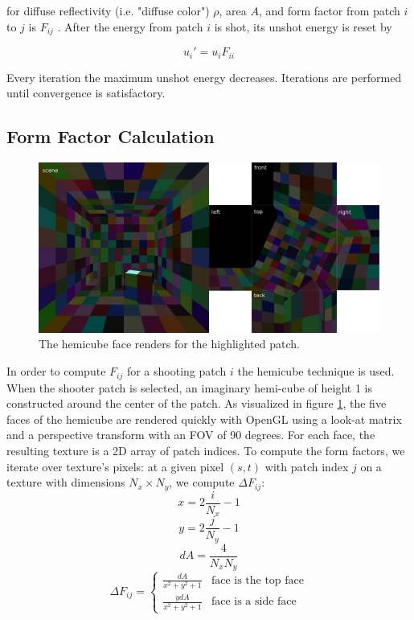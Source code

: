 \documentclass[sigconf]{acmart}
\begin{document}
for diffuse reflectivity (i.e. "diffuse color") ${\rho}$, area $A$, and form factor from patch $i$ to $j$ is $F_{ij}$ \cite{progref}. After the energy from patch $i$ is shot, its unshot energy is reset by

\[u_i' = u_i F_{ii}\]

Every iteration the maximum unshot energy decreases. Iterations are performed until convergence is satisfactory.

\subsection{Form Factor Calculation}

\begin{figure}[t]
    \includegraphics[width=\linewidth]{reportfiles/hemicube}
    \caption{The hemicube face renders for the highlighted patch.}
    \label{fig:hemicube}
\end{figure}

In order to compute $F_{ij}$ for a shooting patch $i$ the hemicube technique \cite{hemicube} is used. When the shooter patch is selected, an imaginary hemi-cube of height 1 is constructed around the center of the patch. As visualized in figure \ref{fig:hemicube}, the five faces of the hemicube are rendered quickly with OpenGL using a look-at matrix and a perspective transform with an FOV of 90 degrees. For each face, the resulting texture is a 2D array of patch indices. To compute the form factors, we iterate over texture's pixels: at a given pixel $(s, t)$ with patch index $j$ on a texture with dimensions $N_x \times N_y$, we compute $\Delta F_{ij}$:
\[x = 2 \frac{i}{N_x} - 1\]
\[y = 2 \frac{j}{N_y} - 1\]
\[{dA} = \frac{4}{N_x N_y}\]
\[
   \Delta F_{ij} = \begin{cases}
        \frac{{dA}}{x^2 + y^2 + 1} & \text{face is the top face} \\
        \frac{y {dA}}{x^2 + y^2 + 1} & \text{face is a side face}
   \end{cases}
\]
\end{document}
